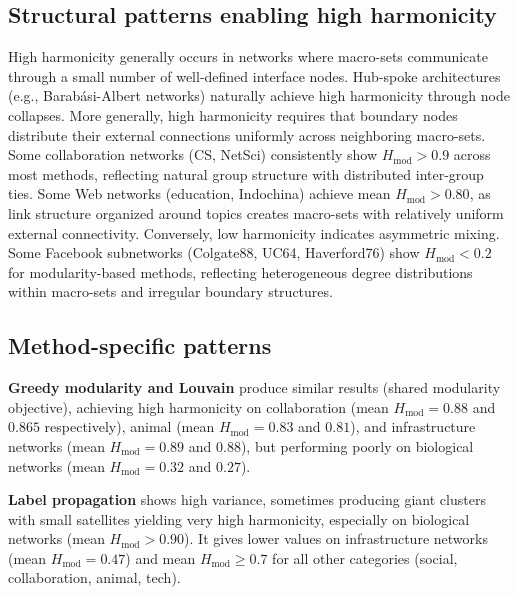 \documentclass[twocolumn,superscriptaddress,tightenlines,aps,prx,floatfix]{revtex4-2}
\begin{document}
\begin{bibunit}

\subsection{Structural patterns enabling high harmonicity}

High harmonicity generally occurs in networks where macro-sets communicate through a small number of well-defined interface nodes. Hub-spoke architectures (e.g., Barab\'asi-Albert networks) naturally achieve high harmonicity through node collapses. More generally, high harmonicity requires that boundary nodes distribute their external connections uniformly across neighboring macro-sets. Some collaboration networks (CS, NetSci) consistently show $H_{\text{mod}} > 0.9$ across most methods, reflecting natural group structure with distributed inter-group ties. Some Web networks (education, Indochina) achieve mean $H_{\text{mod}} > 0.80$, as link structure organized around topics creates macro-sets with relatively uniform external connectivity.
Conversely, low harmonicity indicates asymmetric mixing. 
Some Facebook subnetworks (Colgate88, UC64, Haverford76) show $H_{\text{mod}} < 0.2$ for modularity-based methods, reflecting heterogeneous degree distributions within macro-sets and irregular boundary structures.

\subsection{Method-specific patterns}

\textbf{Greedy modularity and Louvain} produce similar results (shared modularity objective), achieving high harmonicity on collaboration (mean $H_{\text{mod}} = 0.88$ and $0.865$ respectively), animal (mean $H_{\text{mod}} = 0.83$ and $0.81$), and infrastructure networks (mean $H_{\text{mod}} = 0.89$ and $0.88$), but performing poorly on biological networks (mean $H_{\text{mod}} = 0.32$ and $0.27$).

\textbf{Label propagation} shows high variance, sometimes producing giant clusters with small satellites yielding very high harmonicity, especially on biological networks (mean $H_{\text{mod}} > 0.90$). It gives lower values on infrastructure networks (mean $H_{\text{mod}} = 0.47$) and mean $H_{\text{mod}} \geq 0.7$ for all other categories (social, collaboration, animal, tech).


\end{bibunit}
\end{document}
